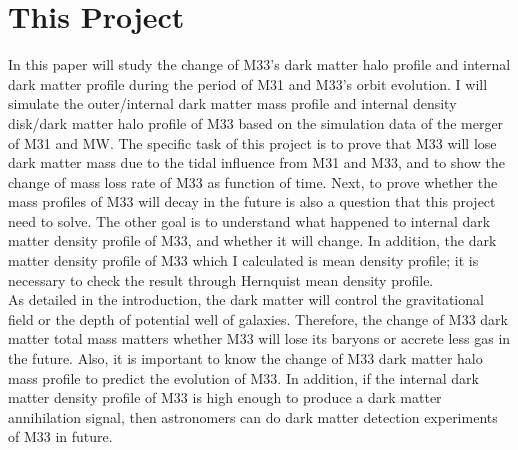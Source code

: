 \documentclass[twocolumn]{aastex63}
\begin{document}
\section{This Project} 
\indent In this paper will study the change of M33's dark matter halo profile and internal dark matter profile during the period of M31 and M33's orbit evolution. I will simulate the outer/internal dark matter mass profile and internal density disk/dark matter halo profile of M33 based on the simulation data of the merger of M31 and MW.
\indent The specific task of this project is to prove that M33 will lose dark matter mass due to the tidal influence from M31 and M33, and to show the change of mass loss rate of M33 as function of time. Next, to prove whether the mass profiles of M33 will decay in the future is also a question that this project need to solve. The other goal is to understand what happened to internal dark matter density profile of M33, and whether it will change. In addition, the dark matter density profile of M33 which I calculated is mean density profile; it is necessary to check the result through Hernquist mean density profile.   \\
\indent As detailed in the introduction, the dark matter will control the gravitational field or the depth of potential well of galaxies. Therefore, the change of M33 dark matter total mass matters whether M33 will lose its baryons or accrete less gas in the future. Also, it is important to know the change of M33 dark matter halo mass profile to predict the evolution of M33. In addition, if the internal dark matter density profile of M33 is high enough to produce a dark matter annihilation signal, then astronomers can do dark matter detection experiments of M33 in future. 
\end{document}
